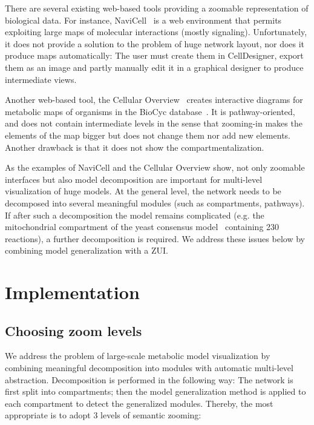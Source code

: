 \documentclass{bmcart}
\begin{document}
There are several existing web-based tools providing a zoomable representation of biological data. For instance, NaviCell~\cite{Kuperstein2013} is a web environment that permits exploiting large maps of molecular interactions (mostly signaling). Unfortunately, it does not provide a solution to the problem of huge network layout, nor does it produce  maps automatically: The user must create them in CellDesigner, export them as an image and partly manually edit it in a graphical designer to produce intermediate views.

Another web-based tool, the Cellular Overview~\cite{Latendresse2011} creates interactive diagrams for metabolic maps of organisms in the BioCyc database~\cite{Caspi2012}. It is pathway-oriented, and does not contain intermediate levels in the sense that zooming-in makes the elements of the map bigger but does not change them nor add new elements. Another drawback is that it does not show the compartmentalization.

As the examples of NaviCell and the Cellular Overview show, not only zoomable interfaces but also model decomposition are important for multi-level visualization of huge models. At the general level, the network needs to be decomposed into several meaningful modules (such as compartments, pathways). If after such a decomposition the model remains complicated (e.g. the mitochondrial compartment of the yeast consensus model~\cite{Herrgard2008} containing 230 reactions), a further decomposition is required. We address these issues below by combining model generalization with a ZUI.


\section*{Implementation}

\subsection*{Choosing zoom levels}
We address the problem of large-scale metabolic model visualization by combining meaningful decomposition into modules with automatic multi-level abstraction. Decomposition is performed in the following way: The network is first split into compartments; then the model generalization method is applied to each compartment to detect the generalized modules. Thereby, the most appropriate is to adopt 3 levels of semantic zooming:
\end{document}
